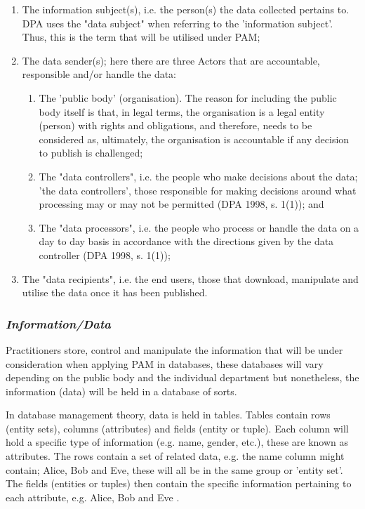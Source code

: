 \begin{enumerate}

\item The information subject(s), i.e. the person(s) the data collected pertains to.  DPA uses the "data subject" when referring to the 'information subject'. Thus, this is the term that will be utilised under PAM; 

\item	The data sender(s); here there are three Actors that are accountable, responsible and/or handle the data:

\begin {enumerate}

\item The 'public body' (organisation). The reason for including the public body itself is that, in legal terms, the organisation is a legal entity (person) with rights and obligations\cite{LegalStatusofPC}, and therefore, needs to be considered as, ultimately, the organisation is accountable if any decision to publish is challenged;

\item The "data controllers", i.e. the people who make decisions about the data; 'the data controllers', those responsible for making decisions around what processing may or may not be permitted (DPA 1998, s. 1(1)); and

\item The "data processors", i.e. the people who process or handle the data on a day to day basis in accordance with the directions given by the data controller (DPA 1998, s. 1(1)); 
\end {enumerate}

\item	The "data recipients", i.e. the end users, those that download, manipulate and utilise the data once it has been published.
\end{enumerate}

\subsubsection {{\it Information/Data}}
Practitioners store, control and manipulate the information that will be under consideration when applying PAM in databases, these databases will vary depending on the public body and the individual department but nonetheless, the information (data) will be held in a database of sorts.  

In database management theory, data is held in tables. Tables contain rows (entity sets), columns (attributes) and fields (entity or tuple). Each column will hold a specific type of information (e.g. name, gender, etc.), these are known as attributes. The rows contain a set of related data, e.g. the name column might contain; Alice, Bob and Eve, these will all be in the same group or 'entity set'. The fields (entities or tuples) then contain the specific information pertaining to each attribute, e.g. Alice, Bob and Eve \cite{Chen:1976:EMU:320434.320440}.

